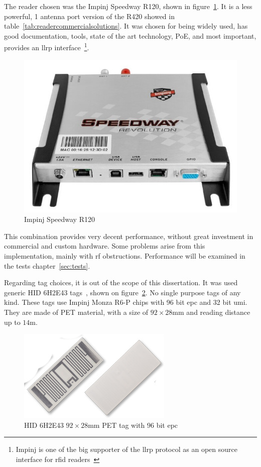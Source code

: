 The reader chosen was the Impinj Speedway R120, shown in figure~\ref{fig:impinjr120}. It is a less powerful, 1 antenna port version of the R420 showed in table~\ref{tab:readercommercialsolutions}. It was chosen for being widely used, has good documentation, tools, state of the art technology, PoE, and most important, provides an \ac{llrp} interface~\footnote{Impinj is one of the big supporter of the \ac{llrp} protocol as an open source interface for \ac{rfid} readers~\cite{SevenRFIDOrganizations}}.

\begin{figure}
    \centering
    \includegraphics[width=0.6\linewidth]{./figs/Speedway_Revolution_R120.jpg}
    \caption{Impinj Speedway R120~\cite{ImpinjSolucoesRAIN}} 
    \label{fig:impinjr120}
\end{figure}

This combination provides very decent performance, without great investment in commercial and custom hardware. Some problems arise from this implementation, mainly with \ac{rf} obstructions. Performance will be examined in the tests chapter~\ref{sec:tests}.  

Regarding tag choices, it is out of the scope of this dissertation. It was used generic HID 6H2E43 tags~\cite{HidetiquetasrfidPdf}, shown on figure~\ref{fig:6H2E43}. No single purpose tags of any kind.
These tags use Impinj Monza R6-P chips with 96 bit \ac{epc} and 32 bit \ac{umi}. They are made of PET material, with a size of $92\times28$mm and reading distance up to $14$m.

\begin{figure}
    \centering
    \includegraphics[width=0.6\linewidth]{./figs/6H2E43.png}
    \caption{HID 6H2E43 $92\times28$mm PET tag with $96$ bit \acs{epc}~\cite{EtusivuIDcontrol}} 
    \label{fig:6H2E43}
\end{figure}

